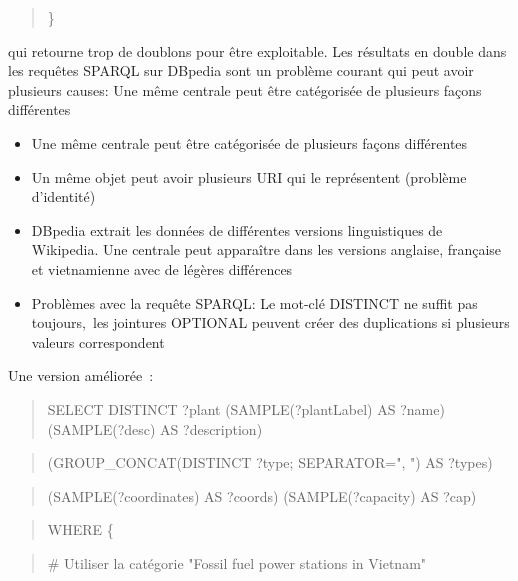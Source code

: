 \documentclass[a4paper,11pt]{report}
\providecommand{\tightlist}{\setlength{\itemsep}{0pt}\setlength{\parskip}{0pt}}
\begin{document}
\begin{quote}
\}
\end{quote}

qui retourne trop de doublons pour être exploitable. Les résultats en double dans les requêtes SPARQL sur DBpedia sont un problème courant qui peut avoir plusieurs causes: Une même centrale peut être catégorisée de plusieurs façons différentes

\begin{itemize}
\tightlist
\item
  Une même centrale peut être catégorisée de plusieurs façons différentes
\item
  Un même objet peut avoir plusieurs URI qui le représentent (problème d'identité)
\end{itemize}

\begin{itemize}
\tightlist
\item
  DBpedia extrait les données de différentes versions linguistiques de Wikipedia. Une centrale peut apparaître dans les versions anglaise, française et vietnamienne avec de légères différences
\end{itemize}

\begin{itemize}
\tightlist
\item
  Problèmes avec la requête SPARQL: Le mot-clé DISTINCT ne suffit pas toujours,~les jointures OPTIONAL peuvent créer des duplications si plusieurs valeurs correspondent
\end{itemize}

Une version améliorée~:

\begin{quote}
SELECT DISTINCT ?plant (SAMPLE(?plantLabel) AS ?name) (SAMPLE(?desc) AS ?description)
\end{quote}

\begin{quote}
(GROUP\_CONCAT(DISTINCT ?type; SEPARATOR=", ") AS ?types)
\end{quote}

\begin{quote}
(SAMPLE(?coordinates) AS ?coords) (SAMPLE(?capacity) AS ?cap)
\end{quote}

\begin{quote}
WHERE \{
\end{quote}

\begin{quote}
\# Utiliser la catégorie "Fossil fuel power stations in Vietnam"
\end{quote}
\end{document}
